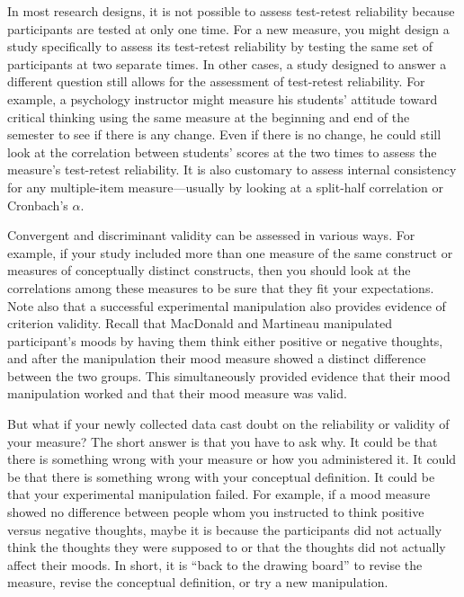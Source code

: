 \documentclass[]{book}
\theoremstyle{definition}
\theoremstyle{definition}
\theoremstyle{remark}
\begin{document}
In most research designs, it is not possible to assess test-retest
reliability because participants are tested at only one time. For a new
measure, you might design a study specifically to assess its test-retest
reliability by testing the same set of participants at two separate
times. In other cases, a study designed to answer a different question
still allows for the assessment of test-retest reliability. For example,
a psychology instructor might measure his students' attitude toward
critical thinking using the same measure at the beginning and end of the
semester to see if there is any change. Even if there is no change, he
could still look at the correlation between students' scores at the two
times to assess the measure's test-retest reliability. It is also
customary to assess internal consistency for any multiple-item
measure---usually by looking at a split-half correlation or Cronbach's
\(\alpha\).

Convergent and discriminant validity can be assessed in various ways.
For example, if your study included more than one measure of the same
construct or measures of conceptually distinct constructs, then you
should look at the correlations among these measures to be sure that
they fit your expectations. Note also that a successful experimental
manipulation also provides evidence of criterion validity. Recall that
MacDonald and Martineau manipulated participant's moods by having them
think either positive or negative thoughts, and after the manipulation
their mood measure showed a distinct difference between the two groups.
This simultaneously provided evidence that their mood manipulation
worked and that their mood measure was valid.

But what if your newly collected data cast doubt on the reliability or
validity of your measure? The short answer is that you have to ask why.
It could be that there is something wrong with your measure or how you
administered it. It could be that there is something wrong with your
conceptual definition. It could be that your experimental manipulation
failed. For example, if a mood measure showed no difference between
people whom you instructed to think positive versus negative thoughts,
maybe it is because the participants did not actually think the thoughts
they were supposed to or that the thoughts did not actually affect their
moods. In short, it is ``back to the drawing board'' to revise the
measure, revise the conceptual definition, or try a new manipulation.
\end{document}
